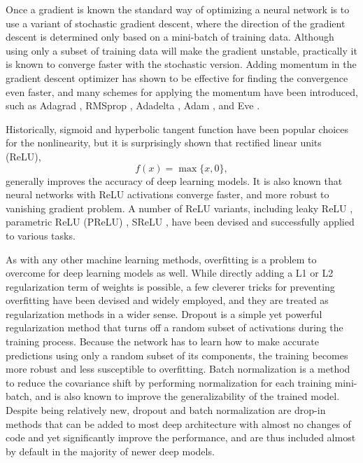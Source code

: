 Once a gradient is known the standard way of optimizing a neural network is to use a variant of stochastic gradient descent, where the direction of the gradient descent is determined only based on a mini-batch of training data.
Although using only a subset of training data will make the gradient unstable, practically it is known to converge faster with the stochastic version.
Adding momentum in the gradient descent optimizer has shown to be effective for finding the convergence even faster, and many schemes for applying the momentum have been introduced, such as Adagrad \cite{duchi2011adagrad}, RMSprop \cite{tieleman2012rmsprop}, Adadelta \cite{zeiler2012adadelta}, Adam \cite{kingma2014adam}, and Eve \cite{koushik2016eve}.

Historically, sigmoid and hyperbolic tangent function have been popular choices for the nonlinearity, but it is surprisingly shown \cite{nair2010relu} that rectified linear units (ReLU),
\begin{equation}
	f(x) = \max \{ x, 0 \},
\end{equation}
generally improves the accuracy of deep learning models.
It is also known that neural networks with ReLU activations converge faster, and more robust to vanishing gradient problem.
A number of ReLU variants, including leaky ReLU \cite{xu2015leakyrelu}, parametric ReLU (PReLU) \cite{he2015prelu}, SReLU \cite{jin2015srelu}, have been devised and successfully applied to various tasks.

As with any other machine learning methods, overfitting is a problem to overcome for deep learning models as well.
While directly adding a L1 or L2 regularization term of weights is possible, a few cleverer tricks for preventing overfitting have been devised and widely employed, and they are treated as regularization methods in a wider sense.
Dropout \cite{srivastava2014dropout} is a simple yet powerful regularization method that turns off a random subset of activations during the training process.
Because the network has to learn how to make accurate predictions using only a random subset of its components, the training becomes more robust and less susceptible to overfitting.
Batch normalization \cite{ioffe2015batchnorm} is a method to reduce the covariance shift by performing normalization for each training mini-batch, and is also known to improve the generalizability of the trained model.
Despite being relatively new, dropout and batch normalization are drop-in methods that can be added to most deep architecture with almost no changes of code and yet significantly improve the performance, and are thus included almost by default in the majority of newer deep models.

